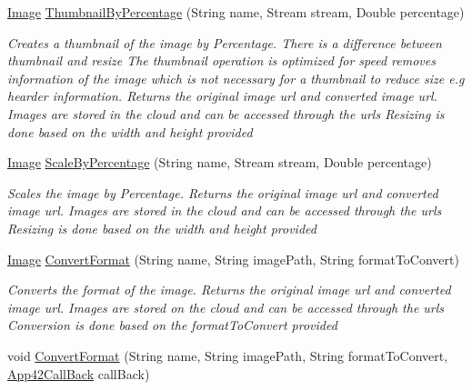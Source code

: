\begin{DoxyCompactItemize}
\hyperlink{classcom_1_1shephertz_1_1app42_1_1paas_1_1sdk_1_1csharp_1_1image_processor_1_1_image}{Image} \hyperlink{classcom_1_1shephertz_1_1app42_1_1paas_1_1sdk_1_1csharp_1_1image_processor_1_1_image_processor_service_a505e21aa6cb69415a4cdc7531e826df2}{Thumbnail\+By\+Percentage} (String name, Stream stream, Double percentage)
\begin{DoxyCompactList}\small\item\em Creates a thumbnail of the image by Percentage. There is a difference between thumbnail and resize The thumbnail operation is optimized for speed removes information of the image which is not necessary for a thumbnail to reduce size e.\+g hearder information. Returns the original image url and converted image url. Images are stored in the cloud and can be accessed through the urls Resizing is done based on the width and height provided \end{DoxyCompactList}\item 
\hyperlink{classcom_1_1shephertz_1_1app42_1_1paas_1_1sdk_1_1csharp_1_1image_processor_1_1_image}{Image} \hyperlink{classcom_1_1shephertz_1_1app42_1_1paas_1_1sdk_1_1csharp_1_1image_processor_1_1_image_processor_service_abe8eb6f5f6310194b07e462d8942fa42}{Scale\+By\+Percentage} (String name, Stream stream, Double percentage)
\begin{DoxyCompactList}\small\item\em Scales the image by Percentage. Returns the original image url and converted image url. Images are stored in the cloud and can be accessed through the urls Resizing is done based on the width and height provided \end{DoxyCompactList}\item 
\hyperlink{classcom_1_1shephertz_1_1app42_1_1paas_1_1sdk_1_1csharp_1_1image_processor_1_1_image}{Image} \hyperlink{classcom_1_1shephertz_1_1app42_1_1paas_1_1sdk_1_1csharp_1_1image_processor_1_1_image_processor_service_a61506a532f3d7720e3135a6ef41af336}{Convert\+Format} (String name, String image\+Path, String format\+To\+Convert)
\begin{DoxyCompactList}\small\item\em Converts the format of the image. Returns the original image url and converted image url. Images are stored on the cloud and can be accessed through the urls Conversion is done based on the format\+To\+Convert provided \end{DoxyCompactList}\item 
void \hyperlink{classcom_1_1shephertz_1_1app42_1_1paas_1_1sdk_1_1csharp_1_1image_processor_1_1_image_processor_service_aaafdb3ff235f7703a1867ece1fe4db68}{Convert\+Format} (String name, String image\+Path, String format\+To\+Convert, \hyperlink{interfacecom_1_1shephertz_1_1app42_1_1paas_1_1sdk_1_1csharp_1_1_app42_call_back}{App42\+Call\+Back} call\+Back)

\end{DoxyCompactItemize}
